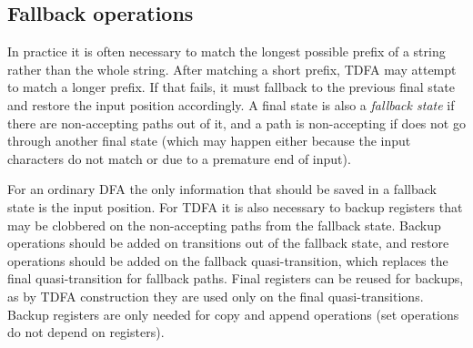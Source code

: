 \documentclass[]{article}
\begin{document}
\subsection{Fallback operations}

In practice it is often necessary to match the longest possible prefix of a string rather than the whole string.
After matching a short prefix, TDFA may attempt to match a longer prefix.
If that fails, it must fallback to the previous final state and restore the input position accordingly.
A final state is also a \emph{fallback state} if there are non-accepting paths out of it,
and a path is non-accepting if does not go through another final state
(which may happen either because the input characters do not match or due to a premature end of input).
\medskip

For an ordinary DFA the only information that should be saved in a fallback state is the input position.
For TDFA it is also necessary to backup registers that may be clobbered on the non-accepting paths from the fallback state.
Backup operations should be added on transitions out of the fallback state,
and restore operations should be added on the fallback quasi-transition,
which replaces the final quasi-transition for fallback paths.
Final registers can be reused for backups, as by TDFA construction they are used only on the final quasi-transitions.
Backup registers are only needed for copy and append operations (set operations do not depend on registers).
\medskip
\end{document}
